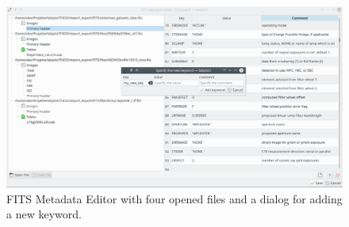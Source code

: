 \begin{figure}
\includegraphics[width=\textwidth]{images/fits_metadata_editor.png}
\caption{FITS Metadata Editor with four opened files and a dialog for adding a new keyword.}
\end{figure}
